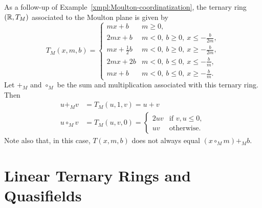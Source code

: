 
\begin{xmpl}\label{xmpl:Moulton-ternary-ring-defn}
    As a follow-up of Example~\ref{xmpl:Moulton-coordinatization}, the ternary ring $(\mathbb{R},T_M)$ associated to the Moulton plane is given by
    \[
        T_M(x,m,b) =
            \begin{cases}
                mx+b        &m\ge0,\\[1mm]
                2mx+b     &m<0,\ b\ge0,\ x\le-\frac b{2m},\\[1mm]
                mx+\frac12b   &m<0,\ b\ge0,\ x\ge-\frac b{2m},\\[1mm]
                2mx+2b    &m<0,\ b\le0,\ x\le-\frac bm,\\[1mm]
                mx+b      &m<0,\ b\le0,\ x\ge-\frac bm.
            \end{cases}
    \]
    Let $+_M$ and $\circ_M$ be the sum and multiplication associated with this ternary ring. Then
    \begin{align*}
        u+_Mv &= T_M(u,1,v)= u + v\\
        u\circ_Mv &= T_M(u,v,0)
        = \begin{cases}
            2uv     &\text{if }v,u\le0,\\
            uv      &\text{otherwise}.
        \end{cases}
    \end{align*}
    Note also that, in this case, $T(x,m,b)$ does not always equal $(x\circ_Mm)+_Mb$.
\end{xmpl}


\section{Linear Ternary Rings and Quasifields}


